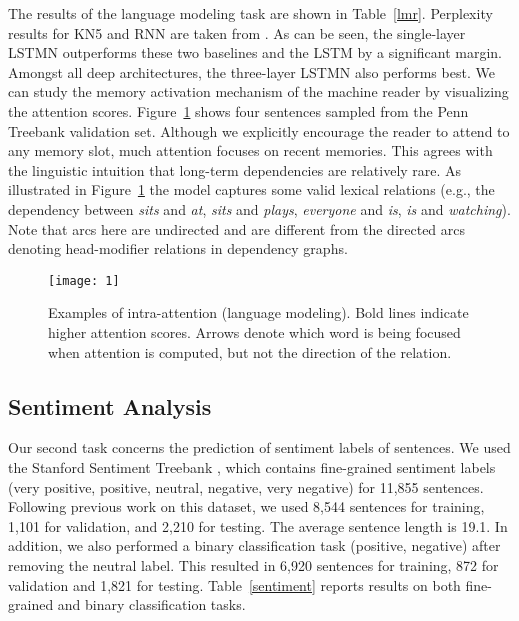 \documentclass[11pt,letterpaper]{article}
\begin{document}
	The results of the language modeling task are shown in
        Table~\ref{lmr}. Perplexity results for KN5 and RNN are taken
        from . As can be seen, the
        single-layer LSTMN outperforms these two baselines and the
        LSTM by a significant margin. Amongst all deep architectures,
        the three-layer LSTMN also performs best. We can study the
        memory activation mechanism of the machine reader by
        visualizing the attention scores. Figure~\ref{vis4lm} shows
        four sentences sampled from the Penn Treebank validation set.
        Although we explicitly encourage the reader to attend to any
        memory slot, much attention focuses on recent memories. This
        agrees with the linguistic intuition that long-term
        dependencies are relatively rare. As illustrated in
        Figure~\ref{vis4lm} the model captures some valid lexical
        relations (e.g., the dependency between \textsl{sits} and
        \textsl{at}, \textsl{sits} and \textsl{plays},
        \textsl{everyone} and \textsl{is}, \textsl{is} and
        \textsl{watching}).  Note that arcs here are undirected and are different from
        the directed arcs denoting head-modifier
        relations in dependency graphs.
	
	\begin{figure}[t]
		\centering
		\begin{center}
			\texttt{[image: 1]}
		\end{center}
		\caption{\label{vis4lm} Examples of intra-attention
			(language modeling). Bold lines indicate higher attention
			scores. Arrows denote which word is being focused when
			attention is computed, but not the direction of the relation.}
\vspace{-2.5ex}
	\end{figure}
	
	\subsection{Sentiment Analysis}
	\label{sec:sentiment-analysis}
	
	Our second task concerns the prediction of sentiment labels of
        sentences. We used the Stanford Sentiment Treebank
        \cite{socher-EtAl:2013:EMNLP}, which contains fine-grained
        sentiment labels (very positive, positive, neutral, negative,
        very negative) for 11,855 sentences.  Following previous work
        on this dataset, we used 8,544 sentences for training, 1,101
        for validation, and 2,210 for testing. The average sentence
        length is 19.1.  In addition, we also performed a binary
        classification task (positive, negative) after removing the
        neutral label. This resulted in 6,920 sentences for training,
        872 for validation and 1,821 for
        testing. Table~\ref{sentiment} reports results on both
        fine-grained and binary classification tasks.
	
\end{document}
